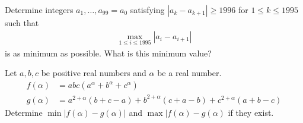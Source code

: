 \documentclass{subfile}
\begin{document}
		\begin{problem}
			Determine integers $a_{1},\ldots,a_{99}=a_{0}$ satisfying $|a_{k}-a_{k+1}|\geq 1996$ for $1\leq k\leq 1995$ such that
				\begin{align*}
					\max\limits_{1\leq i\leq 1995}|a_{i}-a_{i+1}|
				\end{align*}
			is as minimum as possible. What is this minimum value?
		\end{problem}
	
		\begin{problem}
			Let $a,b,c$ be positive real numbers and $\alpha$ be a real number.
				\begin{align*}
					f(\alpha)
						& = abc\left(a^{\alpha}+b^{\alpha}+c^{\alpha}\right)\\
					g(\alpha)
						& = a^{2+\alpha}(b+c-a)+b^{2+\alpha}(c+a-b)+c^{2+\alpha}(a+b-c)
				\end{align*}
			Determine $\min|f(\alpha)-g(\alpha)|$ and $\max|f(\alpha)-g(\alpha)$ if they exist.
		\end{problem}
\end{document}
